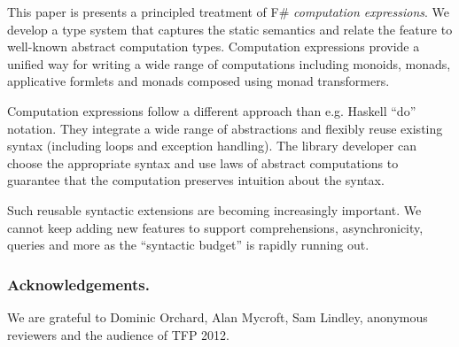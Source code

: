 \documentclass[runningheads,a4paper]{llncs}
\begin{document}
This paper is presents a principled treatment of F\# \emph{computation expressions}. We develop
a type system that captures the static semantics and relate the feature to well-known abstract 
computation types. Computation expressions provide a unified way for writing a wide range of computations 
including monoids, monads, applicative formlets and monads composed using monad transformers.

Computation expressions follow a different approach than e.g. Haskell ``do'' notation. They
integrate a wide range of abstractions and flexibly reuse existing syntax (including loops and 
exception handling). The library developer can choose the appropriate syntax and use laws of
abstract computations to guarantee that the computation preserves intuition about the syntax.

Such reusable syntactic extensions are becoming increasingly important. We cannot keep adding
new features to support comprehensions, asynchronicity, queries and more as the ``syntactic budget''
is rapidly running out.


\vspace{-1em}
\subsubsection{Acknowledgements.} We are grateful to Dominic Orchard, Alan Mycroft, Sam Lindley,
anonymous reviewers and the audience of TFP 2012. 

\vspace{-1em}


\end{document}
